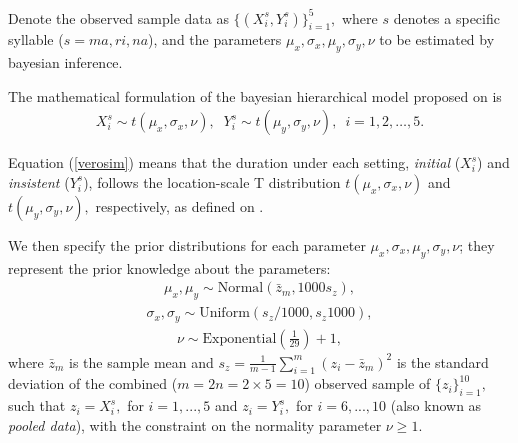 \documentclass[11pt]{article}
\begin{document}

Denote the observed sample data as $\{(X_i^s,Y_i^s)\}_{i=1}^5,$ where $s$ denotes a specific syllable ($s=ma, ri, na$), and the parameters $\mu_x, \sigma_x, \mu_y, \sigma_y, \nu$ to be estimated by bayesian inference.


The mathematical formulation of the bayesian hierarchical model proposed on  is 
\begin{eqnarray}\label{verosim}
X^s_i \sim t(\mu_x, \sigma_x, \nu),\,\,\
Y^s_i \sim t(\mu_y, \sigma_y, \nu), \,\,\,i=1, 2, \ldots, 5.
\end{eqnarray}

Equation (\ref{verosim}) means that the duration under each setting, {\it{initial}} ($X^s_i$) and {\it{insistent}} ($Y^s_i$), follows the location-scale T distribution $t(\mu_x, \sigma_x, \nu)$ and $t(\mu_y, \sigma_y, \nu),$ respectively, as defined on .

We then specify the prior distributions for each parameter $\mu_x, \sigma_x, \mu_y, \sigma_y, \nu$; they represent the prior knowledge about the parameters: 
\begin{eqnarray}\label{mus}
\mu_x,\mu_y \sim \textrm{Normal}(\bar{z}_m, 1000 s_{z}),
\end{eqnarray}
\begin{eqnarray}\label{sigmas}
\sigma_x,\sigma_y \sim \textrm{Uniform}(s_{z}/1000, s_{z} 1000),
\end{eqnarray}
\begin{eqnarray}\label{nu}
\nu \sim \textrm{Exponential}\left( \frac{1}{29} \right)+1,
\end{eqnarray}
where $\bar{z}_m$ is the sample mean and $s_z = \frac{1}{m-1} \sum_{i=1}^{m} (z_i-\bar{z}_m)^2$ is the standard deviation of the combined ($m=2n=2 \times 5=10$) observed sample of $\{z_i\}_{i=1}^{10},$ such that $z_i=X_i^s,$ for $i=1,...,5$ and $z_i=Y_i^s, $ for $i=6,...,10$ (also known as \textit{pooled data}), with the constraint on the normality parameter $\nu\geq 1$. 
\end{document}
